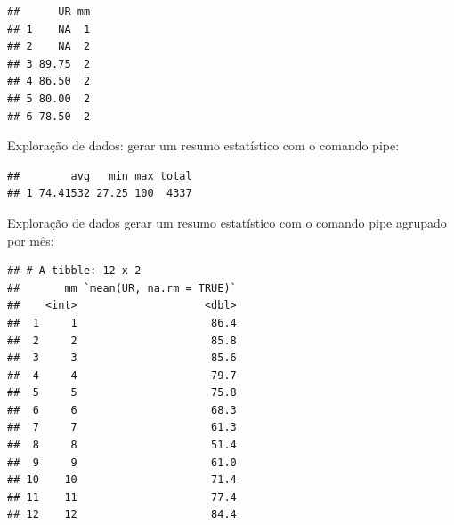 \documentclass[
]{book}
\newenvironment{Shaded}{\begin{snugshade}}{\end{snugshade}}
\newcommand{\DataTypeTok}[1]{\textcolor[rgb]{0.13,0.29,0.53}{#1}}
\newcommand{\KeywordTok}[1]{\textcolor[rgb]{0.13,0.29,0.53}{\textbf{#1}}}
\newcommand{\NormalTok}[1]{#1}
\newcommand{\OperatorTok}[1]{\textcolor[rgb]{0.81,0.36,0.00}{\textbf{#1}}}
\newcommand{\OtherTok}[1]{\textcolor[rgb]{0.56,0.35,0.01}{#1}}
\newcommand{\StringTok}[1]{\textcolor[rgb]{0.31,0.60,0.02}{#1}}
\begin{document}
\begin{Shaded}
\end{Shaded}

\begin{verbatim}
##      UR mm
## 1    NA  1
## 2    NA  2
## 3 89.75  2
## 4 86.50  2
## 5 80.00  2
## 6 78.50  2
\end{verbatim}

Exploração de dados: gerar um resumo estatístico com o comando pipe:

\begin{Shaded}
\end{Shaded}

\begin{verbatim}
##        avg   min max total
## 1 74.41532 27.25 100  4337
\end{verbatim}

Exploração de dados gerar um resumo estatístico com o comando pipe agrupado por mês:

\begin{Shaded}
\end{Shaded}

\begin{verbatim}
## # A tibble: 12 x 2
##       mm `mean(UR, na.rm = TRUE)`
##    <int>                    <dbl>
##  1     1                     86.4
##  2     2                     85.8
##  3     3                     85.6
##  4     4                     79.7
##  5     5                     75.8
##  6     6                     68.3
##  7     7                     61.3
##  8     8                     51.4
##  9     9                     61.0
## 10    10                     71.4
## 11    11                     77.4
## 12    12                     84.4
\end{verbatim}
\end{document}
